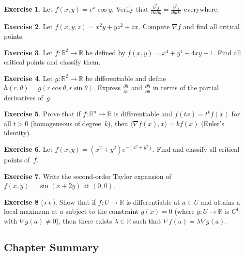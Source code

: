 \documentclass[12pt,a4paper]{book}
\theoremstyle{definition}
\newtheorem{exercise}{Exercise}[chapter]
\begin{document}
\begin{exercise}
Let $f(x,y)=e^{x}\cos y$.  Verify that $\frac{\partial^2 f}{\partial x
\partial y}=\frac{\partial^2 f}{\partial y\partial x}$ everywhere.
\end{exercise}

\begin{exercise}
Let $f(x,y,z)=x^2y+yz^2+zx$.  Compute $\nabla f$ and find all critical
points.
\end{exercise}

\begin{exercise}
Let $f\colon\mathbb{R}^2\to\mathbb{R}$ be defined by
$f(x,y)=x^4+y^4-4xy+1$.  Find all critical points and classify them.
\end{exercise}

\begin{exercise}
Let $g\colon\mathbb{R}^2\to\mathbb{R}$ be differentiable and define
$h(r,\theta)=g(r\cos\theta,r\sin\theta)$.  Express $\frac{\partial h}{\partial r}$
and $\frac{\partial h}{\partial\theta}$ in terms of the partial derivatives of~$g$.
\end{exercise}

\begin{exercise}
Prove that if $f\colon\mathbb{R}^n\to\mathbb{R}$ is differentiable and
$f(tx)=t^k f(x)$ for all $t>0$ (homogeneous of degree~$k$), then
$\langle\nabla f(x),x\rangle=kf(x)$ (Euler's identity).
\end{exercise}

\begin{exercise}
Let $f(x,y)=(x^2+y^2)e^{-(x^2+y^2)}$.  Find and classify all critical
points of~$f$.
\end{exercise}

\begin{exercise}
Write the second-order Taylor expansion of $f(x,y)=\sin(x+2y)$ at
$(0,0)$.
\end{exercise}

\begin{exercise}[$\star\star$]
Show that if $f\colon U\to\mathbb{R}$ is differentiable at $a\in U$ and
attains a local maximum at $a$ subject to the constraint $g(x)=0$
(where $g\colon U\to\mathbb{R}$ is $C^1$ with $\nabla g(a)\ne 0$), then
there exists $\lambda\in\mathbb{R}$ such that
$\nabla f(a)=\lambda\nabla g(a)$.
\end{exercise}

\subsection*{Chapter Summary}
\end{document}
